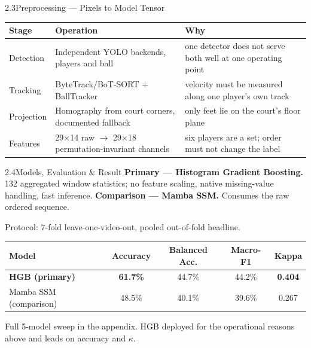 \documentclass[aspectratio=169, 11pt]{beamer}
\begin{document}
\begin{frame}[t]{2.3\quad Preprocessing --- Pixels to Model Tensor}
    \scriptsize
    \begin{tabular}{@{}p{2.0cm}p{5.8cm}p{4.6cm}@{}}
        \toprule
        \textbf{Stage} & \textbf{Operation} & \textbf{Why} \\
        \midrule
        Detection & Independent YOLO backends, players and ball & one
        detector does not serve both well at one operating point \\
        Tracking & ByteTrack/BoT-SORT + BallTracker & velocity must be
        measured along one player's own track \\
        Projection & Homography from court corners, documented fallback &
        only feet lie on the court's floor plane \\
        Features & 29$\times$14 raw $\rightarrow$ 29$\times$18
        permutation-invariant channels & six players are a set; order must
        not change the label \\
        \bottomrule
    \end{tabular}
\end{frame}

\begin{frame}[t]{2.4\quad Models, Evaluation \& Result}
    \small
    \textbf{Primary --- Histogram Gradient Boosting.} 132 aggregated
    window statistics; no feature scaling, native missing-value handling,
    fast inference. \quad
    \textbf{Comparison --- Mamba SSM.} Consumes the raw ordered sequence.

    \vspace{0.15cm}\footnotesize
    Protocol: 7-fold leave-one-video-out, pooled out-of-fold headline.

    \vspace{0.2cm}
    \begin{center}
    \begin{tabular}{@{}lcccc@{}}
        \toprule
        Model & Accuracy & Balanced Acc. & Macro-F1 & Kappa \\
        \midrule
        \textbf{HGB (primary)} & \textbf{61.7\%} & 44.7\% & 44.2\% & \textbf{0.404} \\
        Mamba SSM (comparison) & 48.5\% & 40.1\% & 39.6\% & 0.267 \\
        \bottomrule
    \end{tabular}
    \end{center}
    \vspace{0.15cm}\footnotesize
    Full 5-model sweep in the appendix. HGB deployed for the operational
    reasons above and leads on accuracy and $\kappa$.
\end{frame}
\end{document}
